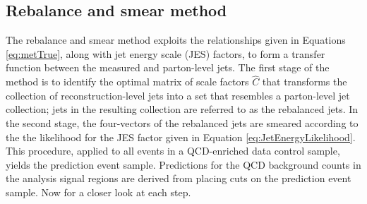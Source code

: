\subsection{Rebalance and smear method}
The rebalance and smear method exploits the relationships given in Equations \ref{eq:metTrue}, along with jet energy scale (JES) factors, to form a transfer function between the measured and parton-level jets. The first stage of the method is to identify the optimal matrix of scale factors $\hat{C}$ that transforms the collection of reconstruction-level jets into a set that resembles a parton-level jet collection; jets in the resulting collection are referred to as the rebalanced jets. In the second stage, the four-vectors of the rebalanced jets are smeared according to the the likelihood for the JES factor given in Equation \ref{eq:JetEnergyLikelihood}. This procedure, applied to all events in a QCD-enriched data control sample, yields the prediction event sample. Predictions for the QCD background counts in the analysis signal regions are derived from placing cuts on the prediction event sample. Now for a closer look at each step.

